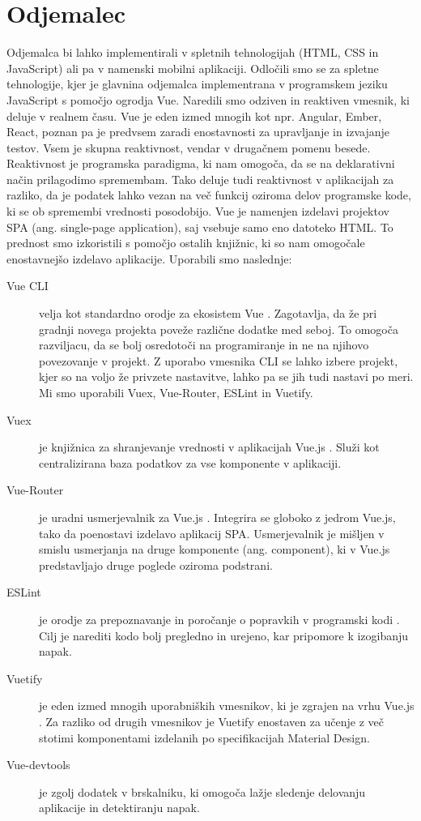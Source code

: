 \documentclass[a4paper, 12pt]{book}
\begin{document}
\section{Odjemalec}

Odjemalca bi lahko implementirali v spletnih tehnologijah (HTML, CSS in JavaScript) ali pa v namenski mobilni aplikaciji. Odločili smo se za spletne tehnologije, kjer je glavnina odjemalca implementrana v programskem jeziku JavaScript s pomočjo ogrodja Vue.  Naredili smo odziven in reaktiven vmesnik, ki deluje v realnem času. Vue je eden izmed mnogih kot npr. Angular, Ember, React, poznan pa je predvsem zaradi enostavnosti za upravljanje in izvajanje testov. Vsem je skupna reaktivnost, vendar v drugačnem pomenu besede. Reaktivnost \cite{reaktivnost} je programska paradigma, ki nam omogoča, da se na deklarativni način prilagodimo spremembam. Tako deluje tudi reaktivnost v aplikacijah za razliko, da je podatek lahko vezan na več funkcij oziroma delov programske kode, ki se ob spremembi vrednosti posodobijo. Vue je namenjen izdelavi projektov SPA (ang. single-page application), saj vsebuje samo eno datoteko HTML. To prednost smo izkoristili s pomočjo ostalih knjižnic, ki so nam omogočale enostavnejšo izdelavo aplikacije. Uporabili smo naslednje:
\begin{description}
\item[Vue CLI] velja kot standardno orodje za ekosistem Vue \cite{VueCLI}. Zagotavlja, da že pri gradnji novega projekta poveže različne dodatke med seboj. To omogoča razviljacu, da se bolj osredotoči na programiranje in ne na njihovo povezovanje v projekt. Z uporabo vmesnika CLI se lahko izbere projekt, kjer so na voljo že privzete nastavitve, lahko pa se jih tudi nastavi po meri. Mi smo uporabili Vuex, Vue-Router, ESLint in Vuetify.
\item[Vuex] je knjižnica za shranjevanje vrednosti v aplikacijah Vue.js \cite{Vuex}. Služi kot centralizirana baza podatkov za vse komponente v aplikaciji. 
\item[Vue-Router] je uradni usmerjevalnik za Vue.js \cite{VueRouter}. Integrira se globoko z jedrom Vue.js, tako da poenostavi izdelavo aplikacij SPA. Usmerjevalnik je mišljen v smislu usmerjanja na druge komponente (ang. component), ki v Vue.js predstavljajo druge poglede oziroma podstrani.
\item[ESLint] je orodje za prepoznavanje in poročanje o popravkih v programski kodi \cite{ESLint}. Cilj je narediti kodo bolj pregledno in urejeno, kar pripomore k izogibanju napak.
\item[Vuetify] je eden izmed mnogih uporabniških vmesnikov, ki je zgrajen na vrhu Vue.js \cite{Vuetify}. Za razliko od drugih vmesnikov je Vuetify enostaven za učenje z več stotimi komponentami izdelanih po specifikacijah Material Design.
\item[Vue-devtools] je zgolj dodatek v brskalniku, ki omogoča lažje sledenje delovanju aplikacije in detektiranju napak. 
\end{description}
\end{document}
